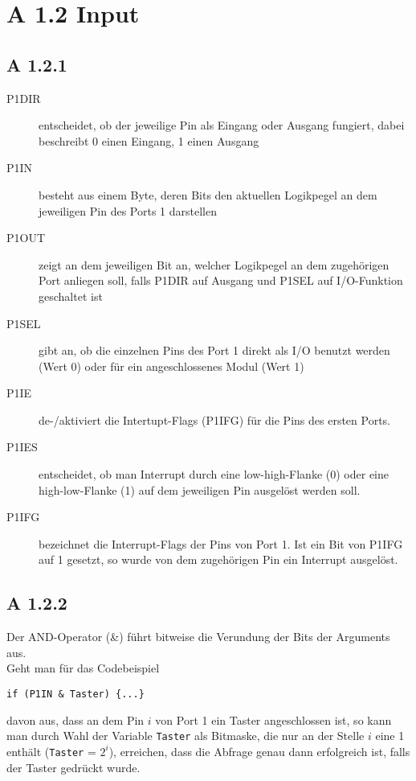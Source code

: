 \documentclass[11pt,a4paper,ngerman]{article}
\begin{document}
\section*{A 1.2	Input}
\subsection*{A 1.2.1}
\begin{description}
\item[P1DIR] entscheidet, ob der jeweilige Pin als Eingang oder Ausgang fungiert, dabei beschreibt 0 einen Eingang, 1 einen Ausgang
\item[P1IN] besteht aus einem Byte, deren Bits den aktuellen Logikpegel an dem jeweiligen Pin des Ports 1 darstellen
\item[P1OUT] zeigt an dem jeweiligen Bit an, welcher Logikpegel an dem zugehörigen Port anliegen soll, falls P1DIR auf Ausgang und P1SEL auf I/O-Funktion geschaltet ist
\item[P1SEL] gibt an, ob die einzelnen Pins des Port 1 direkt als I/O benutzt werden (Wert 0) oder für ein angeschlossenes Modul (Wert 1)
\item[P1IE] de-/aktiviert die Intertupt-Flags (P1IFG) für die Pins des ersten Ports.
\item[P1IES] entscheidet, ob man Interrupt durch eine low-high-Flanke (0) oder eine high-low-Flanke (1) auf dem jeweiligen Pin ausgelöst werden soll.
\item[P1IFG] bezeichnet die Interrupt-Flags der Pins von Port 1. Ist ein Bit von P1IFG auf 1 gesetzt, so wurde von dem zugehörigen Pin ein Interrupt ausgelöst.
\end{description}

\subsection*{A 1.2.2}
Der AND-Operator (\&) führt bitweise die Verundung der Bits der Arguments aus.\\
Geht man für das Codebeispiel
\begin{lstlisting}
if (P1IN & Taster) {...}
\end{lstlisting}
davon aus, dass an dem Pin $i$ von Port 1 ein Taster angeschlossen ist, so kann man durch Wahl der Variable \texttt{Taster} als Bitmaske, die nur an der Stelle $i$ eine 1 enthält (\texttt{Taster} = $2^i$), erreichen, dass die Abfrage genau dann erfolgreich ist, falls der Taster gedrückt wurde.
\end{document}
